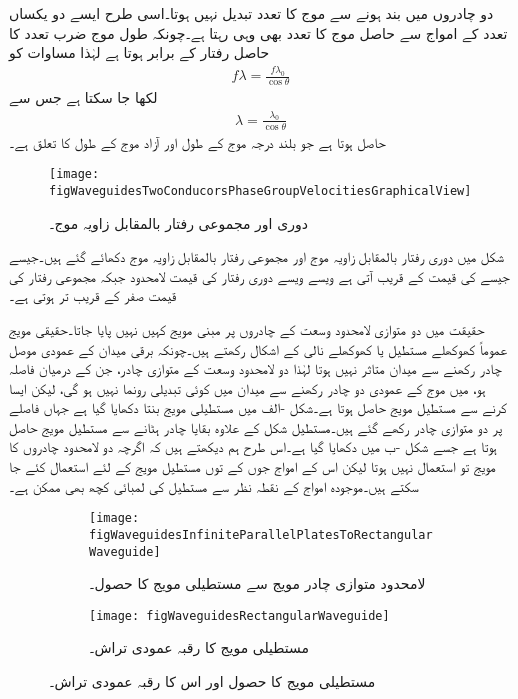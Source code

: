 دو چادروں میں بند ہونے سے  موج کا تعدد تبدیل نہیں ہوتا۔اسی طرح ایسے دو یکساں تعدد کے امواج سے حاصل  موج کا تعدد بھی وہی رہتا ہے۔چونکہ طول موج ضرب تعدد کا حاصل رفتار کے برابر ہوتا ہے لہٰذا مساوات  کو
\begin{align*}
f \lambda=\frac{f \lambda_0}{\cos \theta}
\end{align*}
لکھا جا سکتا ہے جس سے
\begin{align*}
\lambda=\frac{\lambda_0}{\cos \theta}
\end{align*}
حاصل ہوتا ہے جو بلند درجہ موج کے طول  اور آزاد موج کے طول  کا تعلق ہے۔

\begin{figure}
\centering
\texttt{[image: figWaveguidesTwoConducorsPhaseGroupVelocitiesGraphicalView]}
\caption{دوری اور مجموعی رفتار بالمقابل زاویہ موج۔}
\label{شکل_مویج_دوری_مجموعی_رفتار_بالمقابل_زاویہ}
\end{figure} 

شکل  میں دوری رفتار بالمقابل زاویہ موج اور مجموعی رفتار بالمقابل زاویہ موج دکھائے گئے ہیں۔جیسے جیسے  کی قیمت  کے قریب آتی ہے ویسے ویسے دوری رفتار کی قیمت لامحدود جبکہ مجموعی رفتار کی قیمت صفر کے قریب تر ہوتی ہے۔

حقیقت میں دو متوازی لامحدود وسعت کے چادروں پر مبنی مویج کہیں نہیں پایا جاتا۔حقیقی مویج عموماً کھوکھلے مستطیل یا کھوکھلے نالی کے اشکال رکھتے ہیں۔چونکہ برقی میدان کے عمودی موصل چادر رکھنے سے میدان متاثر نہیں ہوتا لہٰذا دو لامحدود وسعت کے متوازی چادر، جن کے درمیان فاصلہ  ہو، میں  موج کے عمودی دو چادر رکھنے سے  میدان میں کوئی تبدیلی رونما نہیں ہو گی، لیکن ایسا کرنے سے مستطیل مویج حاصل ہوتا ہے۔شکل -الف میں مستطیلی مویج بنتا  دکھایا گیا ہے جہاں  فاصلے پر دو متوازی چادر رکھے گئے ہیں۔مستطیل شکل کے علاوہ بقایا چادر ہٹانے سے مستطیل مویج حاصل ہوتا ہے جسے شکل -ب میں دکھایا گیا ہے۔اس طرح ہم دیکھتے ہیں کہ اگرچہ دو لامحدود چادروں کا مویج تو استعمال نہیں ہوتا لیکن اس کے  امواج جوں کے توں مستطیل مویج کے لئے استعمال کئے جا سکتے ہیں۔موجودہ  امواج کے نقطہ نظر سے مستطیل کی  لمبائی کچھ بھی ممکن ہے۔

\begin{figure}
\centering
\begin{subfigure}{0.4\textwidth}
\centering
\texttt{[image: figWaveguidesInfiniteParallelPlatesToRectangularWaveguide]}
\caption{لامحدود متوازی چادر مویج سے مستطیلی مویج کا حصول۔}
\label{شکل_مویج_حصول_مستطیل}
\end{subfigure}%
%
\begin{subfigure}{0.4\textwidth}
\centering
\texttt{[image: figWaveguidesRectangularWaveguide]}
\caption{مستطیلی مویج کا رقبہ عمودی تراش۔}
\label{شکل_مویج_رقبہ_عمودی_تراش_مستطیل}
\end{subfigure}
\caption{مستطیلی مویج کا حصول اور اس کا رقبہ عمودی تراش۔}
\label{شکل_مویج_مستطیل}
\end{figure}

